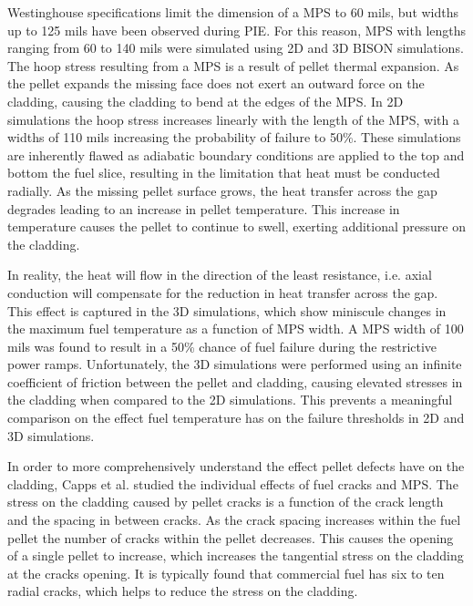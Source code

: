\documentclass[edeposit,fullpage,11pt]{uiucthesis2009}
\begin{document}
Westinghouse specifications limit the dimension of a \gls{MPS} to 60 mils, but widths up to 125 mils have been observed during \gls{PIE}. %
For this reason, \gls{MPS} with lengths ranging from 60 to 140 mils were simulated using 2D and 3D BISON simulations. 
The hoop stress resulting from a \gls{MPS} is a result of pellet thermal expansion. 
As the pellet expands the missing face does not exert an outward force on the cladding, causing the cladding to bend at the edges of the \gls{MPS}.
In 2D simulations the hoop stress increases linearly with the length of the \gls{MPS}, with a widths of 110 mils increasing the probability of failure to 50\%.
These simulations are inherently flawed as adiabatic boundary conditions are applied to the top and bottom the fuel slice, resulting in the limitation that heat must be conducted radially.
As the missing pellet surface grows, the heat transfer across the gap degrades leading to an increase in pellet temperature.
This increase in temperature causes the pellet to continue to swell, exerting additional pressure on the cladding.

In reality, the heat will flow in the direction of the least resistance, i.e. axial conduction will compensate for the reduction in heat transfer across the gap.
This effect is captured in the 3D simulations, which show miniscule changes in the maximum fuel temperature as a function of \gls{MPS} width.
A \gls{MPS} width of 100 mils was found to result in a 50\% chance of fuel failure during the restrictive power ramps.
Unfortunately, the 3D simulations were performed using an infinite coefficient of friction between the pellet and cladding, causing elevated stresses in the cladding when compared to the 2D simulations.
This prevents a meaningful comparison on the effect fuel temperature has on the failure thresholds in 2D and 3D simulations.


In order to more comprehensively understand the effect pellet defects have on the cladding, Capps et al. studied the individual effects of fuel cracks and \gls{MPS}\cite{capps_evaluation_2017}.
The stress on the cladding caused by pellet cracks is a function of the crack length and the spacing in between cracks.
As the crack spacing increases within the fuel pellet the number of cracks within the pellet decreases.
This causes the opening of a single pellet to increase, which increases the tangential stress on the cladding at the cracks opening.
It is typically found that commercial fuel has six to ten radial cracks, which helps to reduce the stress on the cladding. %
\end{document}
